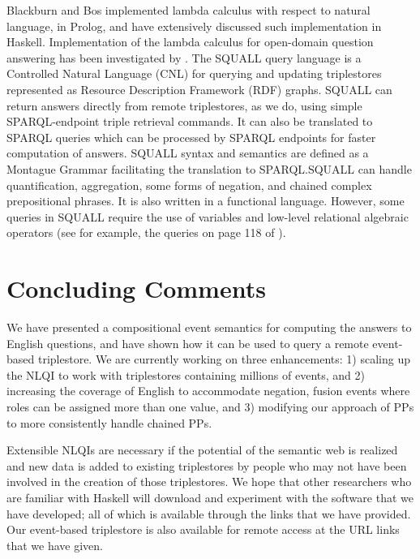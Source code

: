 \documentclass[../main.tex]{subfiles}
\begin{document}
\begin{refsection}
Blackburn and Bos \cite{blackburn2005representation} implemented lambda calculus with respect to natural language, in
Prolog, and \cite{van2010computational} have extensively discussed such implementation in
Haskell. Implementation of the lambda calculus for open-domain question answering has been
investigated by \cite{ahn2005question}.
The SQUALL query language \cite{ferre:squall,ferre2013squall} is a Controlled Natural Language
(CNL) for querying and updating triplestores represented as Resource Description Framework (RDF) graphs. SQUALL can return
answers directly from remote triplestores, as we do, using simple SPARQL-endpoint triple
retrieval commands. It can also be translated to SPARQL queries which can be processed by
SPARQL endpoints for faster computation of answers. SQUALL syntax and semantics are
defined as a Montague Grammar facilitating the translation to SPARQL.SQUALL can handle
quantification, aggregation, some forms of negation, and chained complex prepositional phrases.
It is also written in a functional language. However, some queries in SQUALL require the use of
variables and low-level relational algebraic operators (see for example, the queries on page 118
of \cite{ferre2013squall}).

\section{Concluding Comments}
\label{ext:conclusion}
We have presented a compositional event semantics for computing the answers to English questions,
and have shown how it can be used to query a remote event-based triplestore. We are currently
working on three enhancements: 1) scaling up the NLQI to work with triplestores containing millions of
events, and 2) increasing the coverage of English to accommodate negation, fusion events where roles
can be assigned more than one value, and 3) modifying our approach of PPs to more
consistently handle chained PPs.

Extensible NLQIs are necessary if the potential of the semantic web is realized and new data is added
to existing triplestores by people who may not have been involved in the creation of those triplestores.
We hope that other researchers who are familiar with Haskell will download and experiment with the
software that we have developed; all of which is available through the links that we have provided. Our
event-based triplestore is also available for remote access at the URL
links that we have given.


\end{refsection}
\end{document}
